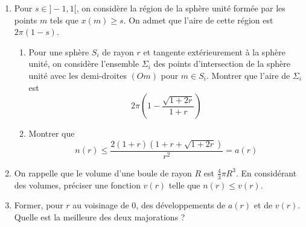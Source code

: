 \begin{enumerate}
\item Pour $s\in]-1,1[$, on considère la région de la sphère unité formée par les points $m$ tels que $x(m)\geq s$. On admet que l'aire de cette région est $2\pi(1-s)$.
\begin{enumerate}
 \item Pour une sphère $S_i$ de rayon $r$ et tangente extérieurement à la sphère unité, on considère l'ensemble $\Sigma_i$ des points d'intersection de la sphère unité avec les demi-droites $(Om)$ pour $m\in S_i$. Montrer que l'aire de $\Sigma_i$ est
\begin{displaymath}
 2\pi\left( 1- \frac{\sqrt{1+2r}}{1+r}\right) 
\end{displaymath}
 \item Montrer que
\begin{displaymath}
 n(r)\leq \frac{2(1+r)(1+r+\sqrt{1+2r})}{r^2}=a(r)
\end{displaymath}
\end{enumerate}
\item On rappelle que le volume d'une boule de rayon $R$ est $\frac{4}{3}\pi R^3$. En considérant des volumes, préciser une fonction $v(r)$ telle que $n(r)\leq v(r)$.
\item Former, pour $r$ au voisinage de $0$, des développements de $a(r)$ et de $v(r)$. Quelle est la meilleure des deux majorations ?
\end{enumerate}
 